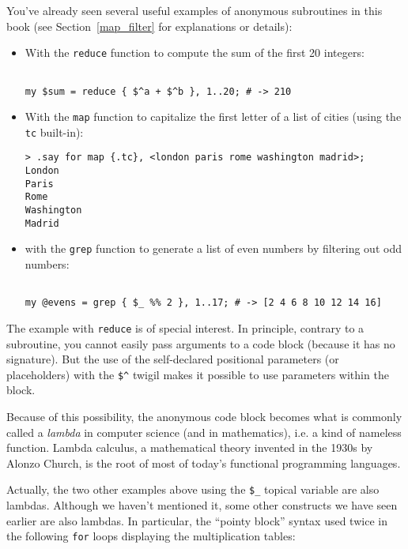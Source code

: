 You've already seen several useful examples of anonymous 
subroutines in this book (see Section~\ref{map_filter} 
for explanations or details):
\begin{itemize}
\item With the {\tt reduce} function to compute the sum of 
the first 20 integers:
\begin{verbatim}

my $sum = reduce { $^a + $^b }, 1..20; # -> 210
\end{verbatim}
\item With the {\tt map} function to capitalize the first 
letter of a list of cities (using the {\tt tc} built-in):
\begin{verbatim}
> .say for map {.tc}, <london paris rome washington madrid>;
London
Paris
Rome
Washington
Madrid
\end{verbatim}
\item with the {\tt grep} function to generate a list of even 
numbers by filtering out odd numbers:
\begin{verbatim}

my @evens = grep { $_ %% 2 }, 1..17; # -> [2 4 6 8 10 12 14 16]
\end{verbatim}
\end{itemize} 

The example with {\tt reduce} is of special interest. In 
principle, contrary to a subroutine, you cannot easily pass 
arguments to a code block (because it has no signature). 
But the use of the self-declared positional parameters 
(or placeholders) with the \verb'$^' twigil makes it 
possible to use parameters within the block. 

Because of this possibility, the anonymous code block becomes 
what is commonly called a \emph{lambda} in computer science (and 
in mathematics), i.e. a kind of nameless function. Lambda 
calculus, a mathematical theory invented in the 1930s by 
Alonzo Church, is the root of most of today's functional 
programming languages.

Actually, the two other examples above using the \verb'$_' 
topical variable are also lambdas. Although we haven't 
mentioned it, some other constructs we have seen earlier are 
also lambdas. In particular, the ``pointy block'' syntax 
used twice in the following {\tt for} loops displaying 
the multiplication tables:


